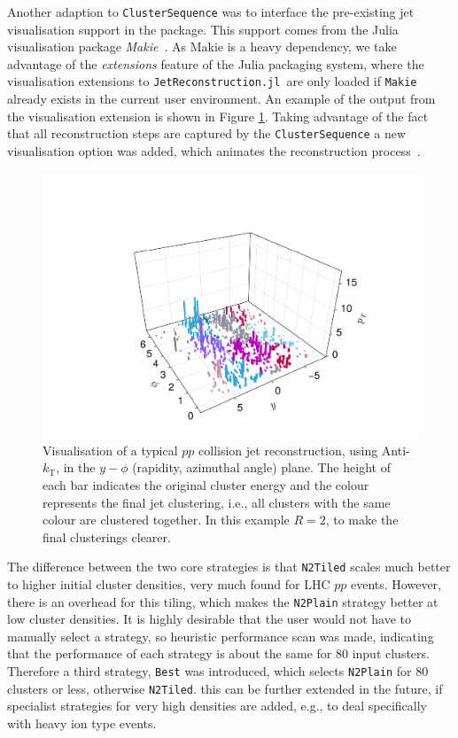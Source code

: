 \documentclass{webofc}
\newcommand{\Akt}{Anti-${k}_\text{T}$}
\newcommand{\JR}{\texttt{JetReconstruction.jl}}
\begin{document}
Another adaption to \texttt{ClusterSequence} was to interface the pre-existing
jet visualisation support in the package. This support comes from the Julia
visualisation package \emph{Makie}~\cite{Danisch2021}. As Makie is a heavy
dependency, we take advantage of the \emph{extensions} feature of the Julia
packaging system, where the visualisation extensions to \JR\ are only loaded if
\texttt{Makie} already exists in the current user environment. An example of the
output from the visualisation extension is shown in Figure \ref{fig:jetvisplot}.
Taking advantage of the fact that all reconstruction steps are captured by the
\texttt{ClusterSequence} a new visualisation option was added, which animates
the reconstruction process~\cite{jetrecoAnimationCHEP2024}.

\begin{figure}[h]
    \begin{center}
        \includegraphics[width=0.8\linewidth]{jetvis-5-compact.pdf}
        \caption{Visualisation of a typical $pp$ collision jet reconstruction, using \Akt, in the $y-\phi$ (rapidity, azimuthal angle) plane. The height of each bar indicates the original cluster energy and the colour represents the final jet clustering, i.e., all clusters with the same colour are clustered together. In this example $R=2$, to make the final clusterings clearer.}
        \label{fig:jetvisplot}
    \end{center}
\end{figure}

The difference between the two core strategies is that \texttt{N2Tiled} scales
much better to higher initial cluster densities, very much found for LHC $pp$
events. However, there is an overhead for this tiling, which makes the
\texttt{N2Plain} strategy better at low cluster densities. It is highly
desirable that the user would not have to manually select a strategy, so
heuristic performance scan was made, indicating that the performance of each
strategy is about the same for 80 input clusters. Therefore a third strategy,
\texttt{Best} was introduced, which selects \texttt{N2Plain} for 80 clusters or
less, otherwise \texttt{N2Tiled}. this can be further extended in the future, if
specialist strategies for very high densities are added, e.g., to deal
specifically with heavy ion type events.
\end{document}
